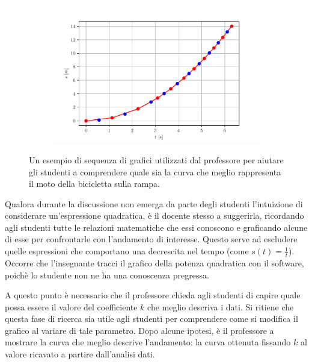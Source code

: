 \documentclass{report} \usepackage[T1]{fontenc} \usepackage[italian]{babel}
\begin{document}
\begin{figure}[H]
\begin{subfigure}[b]{0.49\textwidth}
  \end{subfigure}
  \begin{subfigure}[b]{0.49\textwidth}
  \includegraphics[width=\textwidth]{s-t_parabola6}
  \end{subfigure}
  \caption{
           Un esempio di sequenza di grafici utilizzati
           dal professore per aiutare gli studenti a
           comprendere quale sia la curva che meglio
           rappresenta il moto della bicicletta sulla
           rampa.
          }
  \label{fig:parabola_sequence}
\end{figure}

Qualora durante la discussione non emerga da parte degli studenti
l’intuizione di considerare un'espressione quadratica, è il docente
stesso a suggerirla, ricordando agli studenti tutte le relazioni matematiche
che essi conoscono e graficando alcune di esse per confrontarle con
l'andamento di interesse. Questo serve ad escludere quelle espressioni
che comportano una decrescita nel tempo (come $s(t) = \frac{1}{t}$).
Occorre che l’insegnante tracci il grafico della potenza
quadratica con il software, poichè lo studente non ne ha una conoscenza
pregressa.

A questo punto è necessario che il professore chieda agli studenti di capire quale
possa essere il
valore del coefficiente $k$ che meglio descriva i dati. Si ritiene che questa
fase di ricerca sia utile agli studenti per comprendere come si modifica il
grafico al variare di tale parametro. Dopo alcune ipotesi, è il professore a
mostrare la curva che meglio descrive l’andamento: la curva ottenuta fissando
$k$ al valore ricavato a partire dall’analisi dati.
\end{document}

